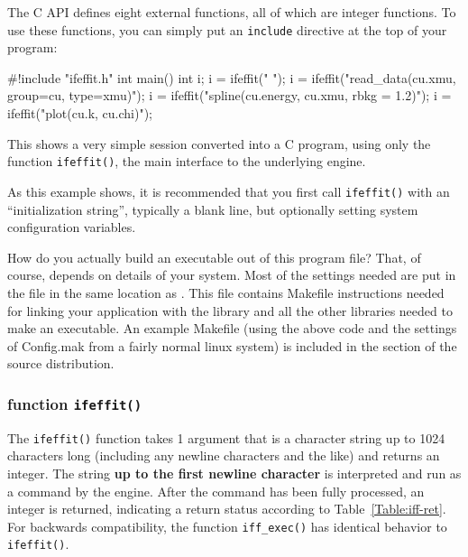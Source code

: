 The {\ifeffit} C API defines eight external functions, all of which are
integer functions.  To use these functions, you can simply put an
{\tt{include}} directive at the top of your program:

{\small{
\begin{VerbSBox}
#!include "ifeffit.h"
int main() {
  int i; 
  i = ifeffit(" ");
  i = ifeffit("read_data(cu.xmu, group=cu, type=xmu)");
  i = ifeffit("spline(cu.energy, cu.xmu, rbkg = 1.2)");
  i = ifeffit("plot(cu.k, cu.chi)");
}
\end{VerbSBox}
}}\noindent
This shows a very simple {\ifeffit} session converted into a C program,
using only the function {\tt{ifeffit()}}, the main interface to the
underlying {\ifeffit} engine.

As this example shows, it is recommended that you first call
{\tt{ifeffit()}} with an ``initialization string'', typically a blank line,
but optionally setting system configuration variables.

How do you actually build an executable out of this program file?  That, of
course, depends on details of your system.  Most of the settings needed are
put in the file {} in the same location as
{}.  This file contains Makefile instructions needed for
linking your {\ifeffit} application with the {\ifeffit} library and all the
other libraries needed to make an executable.  An example Makefile (using
the above code and the settings of Config.mak from a fairly normal linux
system) is included in the {} section of the
source distribution.  {}

\subsubsection{function {\tt{ifeffit()}}}\label{Ch:Scripting-cc:ifeffit}
  
{}
{}
{}
The {\tt{ifeffit()}} function takes 1 argument that is a character string
up to 1024 characters long (including any newline characters and the like)
and returns an integer.  The string {\bf{up to the first newline
    character}} is interpreted and run as a command by the {\ifeffit}
engine.  After the command has been fully processed, an integer is
returned, indicating a return status according to
Table~{\ref{Table:iff-ret}}.  For backwards compatibility, the function
{\tt{iff\_exec()}} has identical behavior to {\tt{ifeffit()}}.

